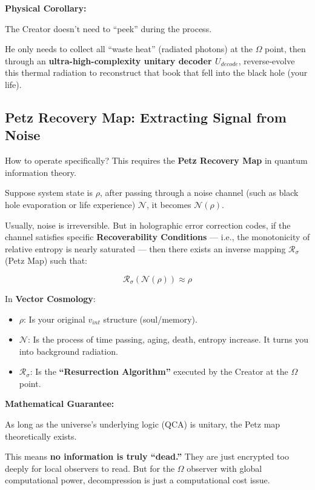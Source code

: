 \textbf{Physical Corollary:}

The Creator doesn't need to ``peek'' during the process.

He only needs to collect all ``waste heat'' (radiated photons) at the $\Omega$ point, then through an \textbf{ultra-high-complexity unitary decoder $U_{decode}$}, reverse-evolve this thermal radiation to reconstruct that book that fell into the black hole (your life).

\subsection{Petz Recovery Map: Extracting Signal from Noise}

How to operate specifically? This requires the \textbf{Petz Recovery Map} in quantum information theory.

Suppose system state is $\rho$, after passing through a noise channel (such as black hole evaporation or life experience) $\mathcal{N}$, it becomes $\mathcal{N}(\rho)$.

Usually, noise is irreversible. But in holographic error correction codes, if the channel satisfies specific \textbf{Recoverability Conditions} --- i.e., the monotonicity of relative entropy is nearly saturated --- then there exists an inverse mapping $\mathcal{R}_{\sigma}$ (Petz Map) such that:

\[\mathcal{R}_{\sigma} (\mathcal{N}(\rho)) \approx \rho\]

In \textbf{Vector Cosmology}:

\begin{itemize}
\item \textbf{$\rho$}: Is your original $v_{int}$ structure (soul/memory).

\item \textbf{$\mathcal{N}$}: Is the process of time passing, aging, death, entropy increase. It turns you into background radiation.

\item \textbf{$\mathcal{R}_{\sigma}$}: Is the \textbf{``Resurrection Algorithm''} executed by the Creator at the $\Omega$ point.
\end{itemize}

\textbf{Mathematical Guarantee:}

As long as the universe's underlying logic (QCA) is unitary, the Petz map theoretically exists.

This means \textbf{no information is truly ``dead.''} They are just encrypted too deeply for local observers to read. But for the $\Omega$ observer with global computational power, decompression is just a computational cost issue.

